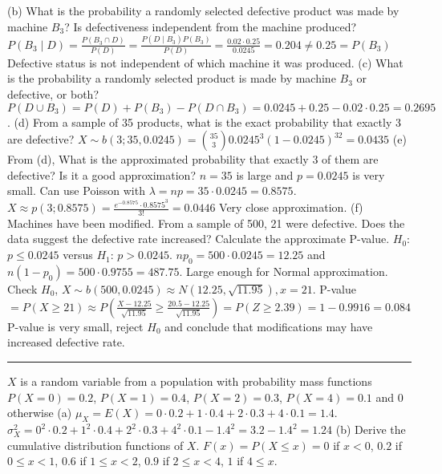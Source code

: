 \documentclass[9pt]{article}
\begin{document}
\begin{multicols*}{2}
    (b) What is the probability a randomly selected defective product was made by machine $B_3$? Is defectiveness independent from the machine produced?
    $P(B_3\mid D) = \frac{P(B_3\cap D)}{P(D)} = \frac{P(D\mid B_3)P(B_3)}{P(D)} = \frac{0.02\cdot 0.25}{0.0245} = 0.204 \not= 0.25 = P(B_3)$ Defective status is not 
    independent of which machine it was produced.\newline
    (c) What is the probability a randomly selected product is made by machine $B_3$ or defective, or both?
    $P(D\cup B_3) = P(D) + P(B_3)-P(D\cap B_3) = 0.0245 + 0.25 - 0.02 \cdot 0.25 = 0.2695$.\newline
    (d) From a sample of 35 products, what is the exact probability that exactly 3 are defective?
    $X\sim b(3; 35, 0.0245) = \binom{35}{3}0.0245^3(1-0.0245)^32 = 0.0435$\newline
    (e) From (d), What is the approximated probability that exactly 3 of them are defective? Is it a good approximation?
    $n=35$ is large and $p=0.0245$ is very small. Can use Poisson with $\lambda = np = 35\cdot 0.0245 = 0.8575$. $X\approx p(3;0.8575) = \frac{e^{-0.8575}\cdot 0.8575^3}{3!} = 0.0446$
    Very close approximation.\newline
    (f) Machines have been modified. From a sample of 500, 21 were defective. Does the data suggest the defective rate increased? Calculate the approximate P-value.
    $H_0$: $p\leq 0.0245$ versus $H_1$: $p>0.0245$. $np_0=500\cdot 0.0245=12.25$ and $n(1-p_0)=500\cdot 0.9755=487.75$. Large enough for Normal approximation.
    Check $H_0$, $X\sim b(500,0.0245) \approx N(12.25,\sqrt{11.95}), x = 21$. P-value $= P(X\geq 21) \approx P( \frac{X-12.25} { \sqrt{11.95}} \geq \frac{20.5-12.25} { \sqrt{11.95} } ) = P(Z\geq 2.39) = 1-0.9916=0.084$
    P-value is very small, reject $H_0$ and conclude that modifications may have increased defective rate.
    \rule{0.5\textwidth}{0.4pt}
    $X$ is a random variable from a population with probability mass functions $P(X=0)=0.2$, $P(X=1)=0.4$, $P(X=2)=0.3$, $P(X=4)=0.1$ and 0 otherwise\newline
    (a) $\mu_X = E(X) = 0\cdot 0.2 + 1\cdot 0.4 + 2\cdot 0.3 + 4 \cdot 0.1 = 1.4$. $\sigma^2_X = 0^2\cdot 0.2+1^2\cdot 0.4 + 2^2\cdot 0.3 + 4^2\cdot 0.1 - 1.4^2 = 3.2-1.4^2=1.24$\newline
    (b) Derive the cumulative distribution functions of $X$. $F(x) = P(X\leq x) = 0$ if $x<0$, $0.2$ if $0\leq x < 1$, $0.6$ if $1\leq x < 2$, $0.9$ if $2\leq x < 4$, $1$ if $4\leq x$.\newline

\end{multicols*}
\end{document}
